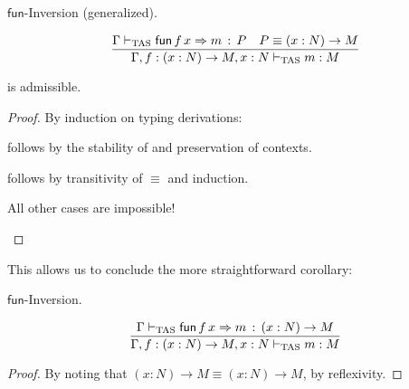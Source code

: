 \begin{lem} $\mathsf{fun}$-Inversion (generalized).
 
\[
\frac{\Gamma\vdash_{\mathrm{TAS}}\mathsf{fun}\,f\,x\Rightarrow m\,:\,P\quad P\equiv\left(x:N\right)\rightarrow M}{\Gamma,f:\left(x:N\right)\rightarrow M,x:N\vdash_{\mathrm{TAS}} m:M}
\]
 
is admissible.
\end{lem}
\begin{proof}
By induction on typing derivations:
 
\begin{casenv}
 \item {} follows by the stability of  and preservation of contexts.
 \item {} follows by transitivity of $\equiv$ and induction.
 \item All other cases are impossible!
\end{casenv}
\end{proof}

This allows us to conclude the more straightforward corollary:

\begin{cor} $\mathsf{fun}$-Inversion.
 
\[
\frac{\Gamma\vdash_{\mathrm{TAS}}\mathsf{fun}\,f\,x\Rightarrow m\,:\,\left(x:N\right)\rightarrow M}{\Gamma,f:\left(x:N\right)\rightarrow M,x:N\vdash_{\mathrm{TAS}} m:M}
\]
\end{cor}
\begin{proof}
By noting that $\left(x:N\right)\rightarrow M\equiv\left(x:N\right)\rightarrow M$, by reflexivity.
\end{proof}

